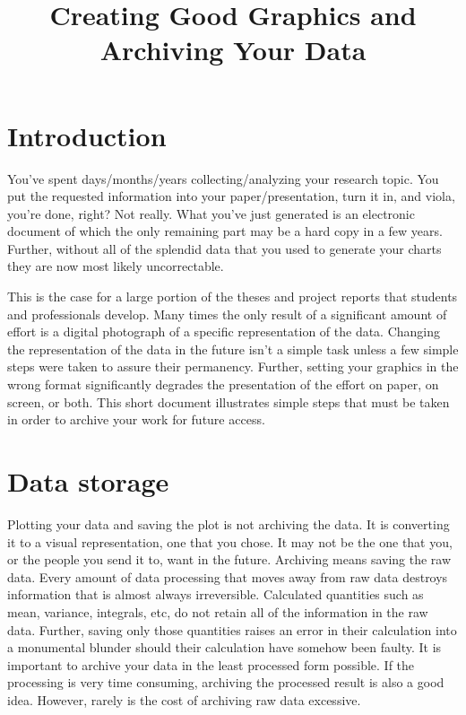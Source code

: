 \documentclass[a4paper]{article}
\title{\phantomsection%
  Creating Good Graphics and Archiving Your Data%
  \label{creating-good-graphics-and-archiving-your-data}}
\author{}
\date{}
\begin{document}
\maketitle


\section{Introduction%
  \label{introduction}%
}

You've spent days/months/years collecting/analyzing your research topic.
You put the requested information into your paper/presentation, turn it
in, and viola, you're done, right? Not really. What you've just
generated is an electronic document of which the only remaining part may
be a hard copy in a few years. Further, without all of the splendid data
that you used to generate your charts they are now most likely
uncorrectable.

This is the case for a large portion of the theses and project reports
that students and professionals develop. Many times the only result of a
significant amount of effort is a digital photograph of a specific
representation of the data. Changing the representation of the data in
the future isn't a simple task unless a few simple steps were taken to
assure their permanency. Further, setting your graphics in the wrong
format significantly degrades the presentation of the effort on paper,
on screen, or both. This short document illustrates simple steps that
must be taken in order to archive your work for future access.


\section{Data storage%
  \label{data-storage}%
}

Plotting your data and saving the plot is not archiving the data. It is
converting it to a visual representation, one that you chose. It may not
be the one that you, or the people you send it to, want in the future.
Archiving means saving the raw data. Every amount of data processing
that moves away from raw data destroys information that is almost always
irreversible. Calculated quantities such as mean, variance, integrals,
etc, do not retain all of the information in the raw data. Further,
saving only those quantities raises an error in their calculation into a
monumental blunder should their calculation have somehow been faulty. It
is important to archive your data in the least processed form possible.
If the processing is very time consuming, archiving the processed result
is also a good idea. However, rarely is the cost of archiving raw data
excessive.
\end{document}
